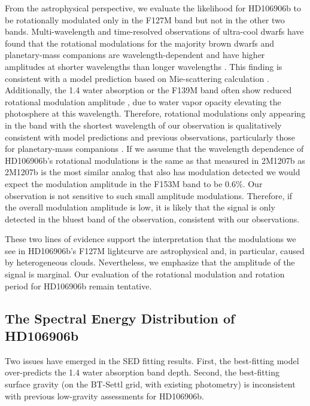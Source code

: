 \documentclass[twocolumn]{aastex62}
\begin{document}
From the astrophysical perspective, we evaluate the likelihood for HD106906b to be rotationally modulated only in the F127M band but not in the other two bands. Multi-wavelength and time-resolved observations of ultra-cool dwarfs have found that the rotational modulations for the majority  brown dwarfs and planetary-mass companions are wavelength-dependent and have higher amplitudes at shorter wavelengths than longer wavelengths \citep[e.g.,][]{Zhou2019,Zhou2016,Yang2015,Apai2013,Schlawin2017}. This {finding} is consistent with a model prediction based on Mie-scattering calculation \citep{Hiranaka2016, Lew2016,Schlawin2017}. Additionally, the 1.4 \micron{} water absorption or the F139M band often show reduced rotational modulation amplitude \citep[e.g.,][]{Apai2013}, due to water vapor opacity elevating the photosphere at this wavelength.  Therefore, rotational modulations only appearing in the band with the shortest wavelength of our observation is qualitatively consistent with model predictions and previous observations, particularly those for planetary-mass companions \citep{Zhou2016,Zhou2019}. If we assume that the wavelength dependence of HD106906b's rotational modulations is the same as that measured in 2M1207b \citep{Zhou2016} as 2M1207b is the most similar analog that also has modulation detected we would expect the modulation amplitude in the F153M band to be 0.6\%. Our observation is not sensitive to such small amplitude modulations. Therefore, if the overall modulation amplitude is low, it is likely that the signal is only detected in the bluest band of the observation, consistent with our observations.

These two lines of evidence support the interpretation that the modulations we see in HD106906b's F127M lightcurve are astrophysical and, in particular, caused by heterogeneous clouds. Nevertheless, we emphasize that the amplitude of the signal is marginal. Our evaluation of the rotational modulation and rotation period for HD106906b remain {tentative}.


\subsection{The Spectral Energy Distribution of  HD106906b}
Two issues have emerged in the SED fitting results. First, the best-fitting model over-predicts the 1.4 \micron{} water absorption band depth. Second, the best-fitting surface gravity (on the BT-Settl grid, with existing photometry) is inconsistent with previous low-gravity assessments for HD106906b.
\end{document}
